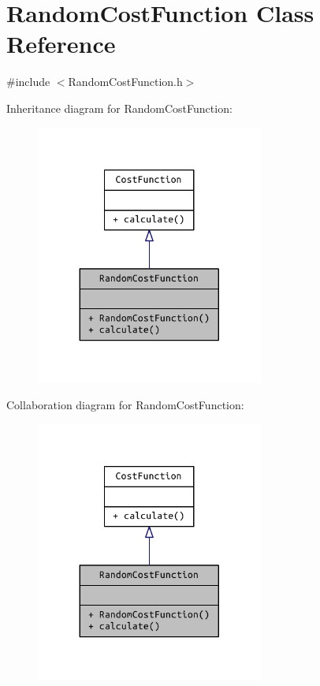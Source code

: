 \hypertarget{class_random_cost_function}{}\section{Random\+Cost\+Function Class Reference}
\label{class_random_cost_function}


{\ttfamily \#include $<$Random\+Cost\+Function.\+h$>$}



Inheritance diagram for Random\+Cost\+Function\+:
\nopagebreak
\begin{figure}[H]
\begin{center}
\leavevmode
\includegraphics[width=212pt]{class_random_cost_function__inherit__graph}
\end{center}
\end{figure}


Collaboration diagram for Random\+Cost\+Function\+:
\nopagebreak
\begin{figure}[H]
\begin{center}
\leavevmode
\includegraphics[width=212pt]{class_random_cost_function__coll__graph}
\end{center}
\end{figure}
